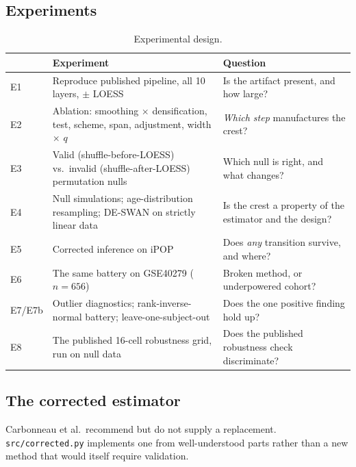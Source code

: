 \documentclass{article}
\begin{document}
\subsection{Experiments}

\begin{table}[h]
\centering
\caption{Experimental design.}
\begin{tabular}{lp{6.1cm}p{5.4cm}}
\toprule
& Experiment & Question \\
\midrule
E1 & Reproduce published pipeline, all 10 layers, $\pm$ LOESS & Is the artifact present, and how large? \\
E2 & Ablation: smoothing $\times$ densification, test, scheme, span, adjustment, width $\times$ $q$ & \emph{Which step} manufactures the crest? \\
E3 & Valid (shuffle-before-LOESS) vs.\ invalid (shuffle-after-LOESS) permutation nulls & Which null is right, and what changes? \\
E4 & Null simulations; age-distribution resampling; DE-SWAN on strictly linear data & Is the crest a property of the estimator and the design? \\
E5 & Corrected inference on iPOP & Does \emph{any} transition survive, and where? \\
E6 & The same battery on GSE40279 ($n=656$) & Broken method, or underpowered cohort? \\
E7/E7b & Outlier diagnostics; rank-inverse-normal battery; leave-one-subject-out & Does the one positive finding hold up? \\
E8 & The published 16-cell robustness grid, run on null data & Does the published robustness check discriminate? \\
\bottomrule
\end{tabular}
\end{table}

\subsection{The corrected estimator}
\label{sec:corrected}

Carbonneau et al.\ recommend but do not supply a replacement. \texttt{src/corrected.py} implements one from well-understood parts rather than a new method that would itself require validation.
\end{document}
